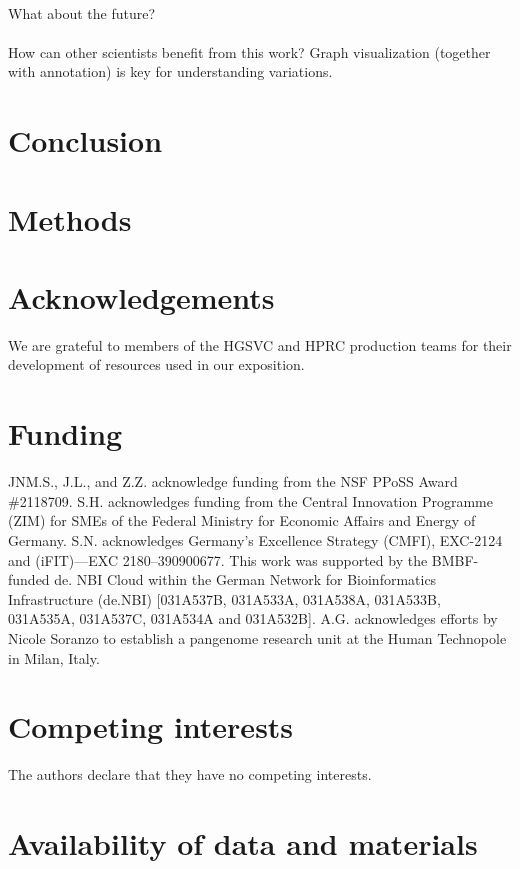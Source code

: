 \documentclass[11pt,hidelinks]{article}
\begin{document}
\paragraph{}
What about the future?
\paragraph{}
How can other scientists benefit from this work? Graph visualization (together with annotation) is key for understanding variations.
\section{Conclusion}

\section{Methods}




\section*{Acknowledgements}
We are grateful to members of the HGSVC and HPRC production teams for their development of resources used in our exposition.


\section*{Funding}
JNM.S., J.L., and Z.Z. acknowledge funding from the NSF PPoSS Award \#2118709.
S.H. acknowledges funding from the Central Innovation Programme (ZIM) for SMEs of the Federal Ministry for Economic Affairs and Energy of Germany.
S.N. acknowledges Germany’s Excellence Strategy (CMFI), EXC-2124 and (iFIT)—EXC 2180–390900677.
This work was supported by the BMBF-funded de.
NBI Cloud within the German Network for Bioinformatics Infrastructure (de.NBI) [031A537B, 031A533A, 031A538A, 031A533B, 031A535A, 031A537C, 031A534A and 031A532B].
A.G. acknowledges efforts by Nicole Soranzo to establish a pangenome research unit at the Human Technopole in Milan, Italy.

\section*{Competing interests}
The authors declare that they have no competing interests.

\section*{Availability of data and materials}
\end{document}
